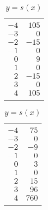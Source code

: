 \begin{exercises}
\begin{problem}
\begin{table}[!htb]
\begin{widepage}
	\hfill
	\begin{subtable}{.2\textwidth}
		\centering
		\caption{$y=r(x)$}
		\label{poly:tab:findformular}
		\begin{tabular}{rr}
			\beforeheading
			\heading{$x$} & \heading{$y$} \\ \afterheading
			$-4$          & $105$         \\\normalline
			$-3$          & $0$           \\\normalline
			$-2$          & $-15$         \\\normalline
			$-1$          & $0$           \\\normalline
			$0$           & $9$           \\\normalline
			$1$           & $0$           \\\normalline
			$2$           & $-15$         \\\normalline
			$3$           & $0$           \\\normalline
			$4$           & $105$         \\\lastline
		\end{tabular}
	\end{subtable}
	\hfill
	\begin{subtable}{.2\textwidth}
		\centering
		\caption{$y=s(x)$}
		\label{poly:tab:findformulas}
		\begin{tabular}{rr}
			\beforeheading
			\heading{$x$} & \heading{$y$} \\ \afterheading
			$-4$          & $75$          \\\normalline
			$-3$          & $0$           \\\normalline
			$-2$          & $-9$          \\\normalline
			$-1$          & $0$           \\\normalline
			$0$           & $3$           \\\normalline
			$1$           & $0$           \\\normalline
			$2$           & $15$          \\\normalline
			$3$           & $96$          \\\normalline
			$4$           & $760$         \\\lastline
		\end{tabular}
	\end{subtable}
	\end{widepage}
\end{table}


\end{problem}
\end{exercises}
